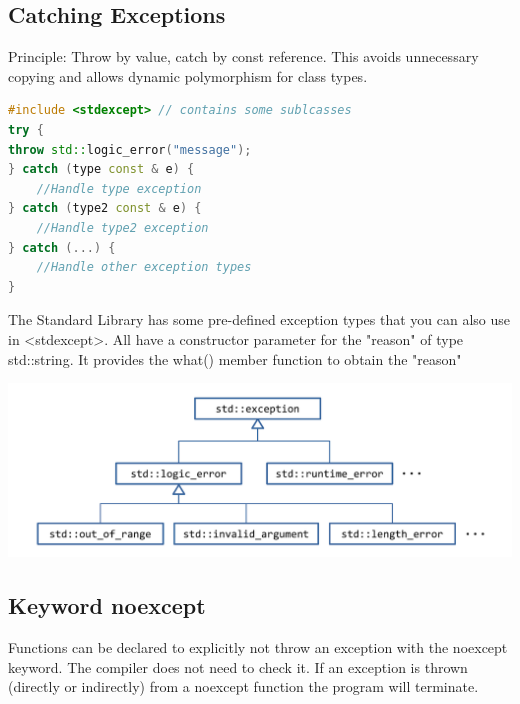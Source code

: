 \subsection{Catching Exceptions}
Principle: Throw by value, catch by const reference. This avoids unnecessary copying and allows dynamic polymorphism for class types.
\begin{lstlisting}[language=C++]
#include <stdexcept> // contains some sublcasses
try {
throw std::logic_error("message");
} catch (type const & e) {
	//Handle type exception 
} catch (type2 const & e) {
	//Handle type2 exception 
} catch (...) {
	//Handle other exception types 
}
\end{lstlisting}
The Standard Library has some pre-defined exception types that you can also use in <stdexcept>. All have a constructor parameter for the "reason" of type std::string. It provides the what() member function to obtain the "reason"
\begin{center}
	\includegraphics[width=0.75\linewidth]{images/exceptions}
\end{center}

\subsection{Keyword noexcept}
Functions can be declared to explicitly not throw an exception with the noexcept keyword. The compiler does not need to check it.  If an exception is thrown (directly or indirectly) from a noexcept function the program will terminate.

\break